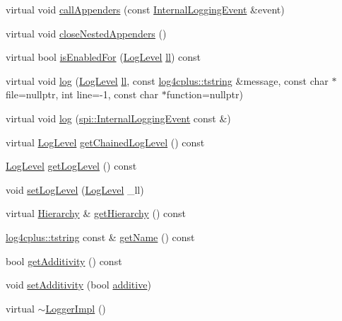 \begin{DoxyCompactItemize}
\item 
virtual void \hyperlink{classlog4cplus_1_1spi_1_1LoggerImpl_aa32379c66172d93901b181e117f0ecc4}{call\-Appenders} (const \hyperlink{classlog4cplus_1_1spi_1_1InternalLoggingEvent}{Internal\-Logging\-Event} \&event)
\item 
virtual void \hyperlink{classlog4cplus_1_1spi_1_1LoggerImpl_a30c71ca5b85fe1b1640f505181ba9dc6}{close\-Nested\-Appenders} ()
\item 
virtual bool \hyperlink{classlog4cplus_1_1spi_1_1LoggerImpl_aae2fa3a122584342b0273397200a2080}{is\-Enabled\-For} (\hyperlink{namespacelog4cplus_abd332cc8c98fefcbbdcf57b6b3867de9}{Log\-Level} \hyperlink{classlog4cplus_1_1spi_1_1LoggerImpl_a8a3672445f1145629a59e27655c480c4}{ll}) const 
\item 
virtual void \hyperlink{classlog4cplus_1_1spi_1_1LoggerImpl_ada301a51e1dc8a1599a511484bed069f}{log} (\hyperlink{namespacelog4cplus_abd332cc8c98fefcbbdcf57b6b3867de9}{Log\-Level} \hyperlink{classlog4cplus_1_1spi_1_1LoggerImpl_a8a3672445f1145629a59e27655c480c4}{ll}, const \hyperlink{namespacelog4cplus_a3c9287f6ebcddc50355e29d71152117b}{log4cplus\-::tstring} \&message, const char $\ast$file=nullptr, int line=-\/1, const char $\ast$function=nullptr)
\item 
virtual void \hyperlink{classlog4cplus_1_1spi_1_1LoggerImpl_ae81fc74908ca200ea29b48ba35dabd29}{log} (\hyperlink{classlog4cplus_1_1spi_1_1InternalLoggingEvent}{spi\-::\-Internal\-Logging\-Event} const \&)
\item 
virtual \hyperlink{namespacelog4cplus_abd332cc8c98fefcbbdcf57b6b3867de9}{Log\-Level} \hyperlink{classlog4cplus_1_1spi_1_1LoggerImpl_a3f8989f7d76ea15e3aa8441bed1df22b}{get\-Chained\-Log\-Level} () const 
\item 
\hyperlink{namespacelog4cplus_abd332cc8c98fefcbbdcf57b6b3867de9}{Log\-Level} \hyperlink{classlog4cplus_1_1spi_1_1LoggerImpl_a597015470202762d3269142962eaeeee}{get\-Log\-Level} () const 
\item 
void \hyperlink{classlog4cplus_1_1spi_1_1LoggerImpl_aeee68389097c853548eaaf950a13c7eb}{set\-Log\-Level} (\hyperlink{namespacelog4cplus_abd332cc8c98fefcbbdcf57b6b3867de9}{Log\-Level} \-\_\-ll)
\item 
virtual \hyperlink{classlog4cplus_1_1Hierarchy}{Hierarchy} \& \hyperlink{classlog4cplus_1_1spi_1_1LoggerImpl_a875b2cefa97c668903205338827a21b1}{get\-Hierarchy} () const 
\item 
\hyperlink{namespacelog4cplus_a3c9287f6ebcddc50355e29d71152117b}{log4cplus\-::tstring} const \& \hyperlink{classlog4cplus_1_1spi_1_1LoggerImpl_a233b670c8f455c72958dd4c2aa71277e}{get\-Name} () const 
\item 
bool \hyperlink{classlog4cplus_1_1spi_1_1LoggerImpl_a6dec7372d25602a38e16265686c01940}{get\-Additivity} () const 
\item 
void \hyperlink{classlog4cplus_1_1spi_1_1LoggerImpl_a392d5d7f0b4dd1417c5c1dfb6b3846b3}{set\-Additivity} (bool \hyperlink{classlog4cplus_1_1spi_1_1LoggerImpl_ae41a18de17a3693b52fd4e37234a5045}{additive})
\item 
virtual \hyperlink{classlog4cplus_1_1spi_1_1LoggerImpl_a9a4265b506b4601fe2083fb7d77efc5a}{$\sim$\-Logger\-Impl} ()
\end{DoxyCompactItemize}
